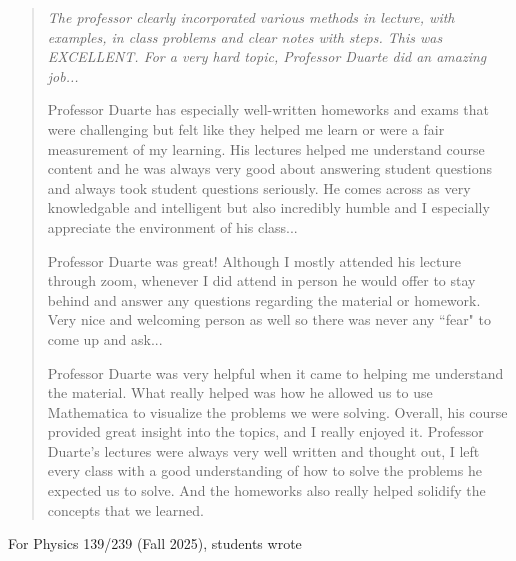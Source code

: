 \documentclass[11pt,letterpaper,notitlepage]{article}
\begin{document}
\begin{quotation}
    \itshape
    The professor clearly incorporated various methods in lecture, with examples, in class problems and clear notes with steps.
    This was EXCELLENT.
    For a very hard topic, Professor Duarte did an amazing job...

    Professor Duarte has especially well-written homeworks and exams that were challenging but felt like they helped me learn or were a fair measurement of my learning.
    His lectures helped me understand course content and he was always very good about answering student questions and always took student questions seriously.
    He comes across as very knowledgable and intelligent but also incredibly humble and I especially appreciate the environment of his class...

    Professor Duarte was great! Although I mostly attended his lecture through zoom, whenever I did attend in person he would offer to stay behind and answer any questions regarding the material or homework.
    Very nice and welcoming person as well so there was never any ``fear" to come up and ask...

    Professor Duarte was very helpful when it came to helping me understand the material. What really helped was how he allowed us to use Mathematica to visualize the problems we were solving. Overall, his course provided great insight into the topics, and I really enjoyed it.
    Professor Duarte's lectures were always very well written and thought out, I left every class with a good understanding of how to solve the problems he expected us to solve.
    And the homeworks also really helped solidify the concepts that we learned.
\end{quotation}
For Physics 139/239 (Fall 2025), students wrote
\end{document}
